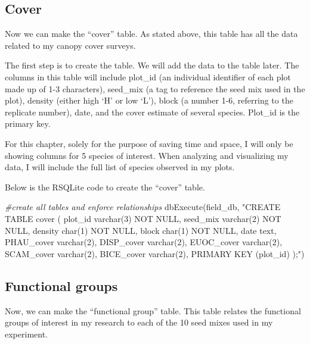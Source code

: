 \documentclass[
]{book}
\newenvironment{Shaded}{\begin{snugshade}}{\end{snugshade}}
\newcommand{\CommentTok}[1]{\textcolor[rgb]{0.56,0.35,0.01}{\textit{#1}}}
\newcommand{\FunctionTok}[1]{\textcolor[rgb]{0.00,0.00,0.00}{#1}}
\newcommand{\NormalTok}[1]{#1}
\newcommand{\StringTok}[1]{\textcolor[rgb]{0.31,0.60,0.02}{#1}}
\begin{document}
\hypertarget{cover}{%
\subsection{Cover}\label{cover}}

Now we can make the ``cover'' table. As stated above, this table has all the data related to my canopy cover surveys.

The first step is to create the table. We will add the data to the table later. The columns in this table will include plot\_id (an individual identifier of each plot made up of 1-3 characters), seed\_mix (a tag to reference the seed mix used in the plot), density (either high `H' or low `L'), block (a number 1-6, referring to the replicate number), date, and the cover estimate of several species. Plot\_id is the primary key.

For this chapter, solely for the purpose of saving time and space, I will only be showing columns for 5 species of interest. When analyzing and visualizing my data, I will include the full list of species observed in my plots.

Below is the RSQLite code to create the ``cover'' table.

\begin{Shaded}
\begin{Highlighting}[]
\CommentTok{\#create all tables and enforce relationships}
\FunctionTok{dbExecute}\NormalTok{(field\_db, }\StringTok{"CREATE TABLE cover (}
\StringTok{          plot\_id varchar(3) NOT NULL,}
\StringTok{          seed\_mix varchar(2) NOT NULL,}
\StringTok{          density char(1) NOT NULL,}
\StringTok{          block char(1) NOT NULL,}
\StringTok{          date text,}
\StringTok{          PHAU\_cover varchar(2),}
\StringTok{          DISP\_cover varchar(2),}
\StringTok{          EUOC\_cover varchar(2),}
\StringTok{          SCAM\_cover varchar(2),}
\StringTok{          BICE\_cover varchar(2),}
\StringTok{          PRIMARY KEY (plot\_id)}
\StringTok{          );"}\NormalTok{)}
\end{Highlighting}
\end{Shaded}

\hypertarget{functional-groups}{%
\subsection{Functional groups}\label{functional-groups}}

Now, we can make the ``functional group'' table. This table relates the functional groups of interest in my research to each of the 10 seed mixes used in my experiment.
\end{document}
